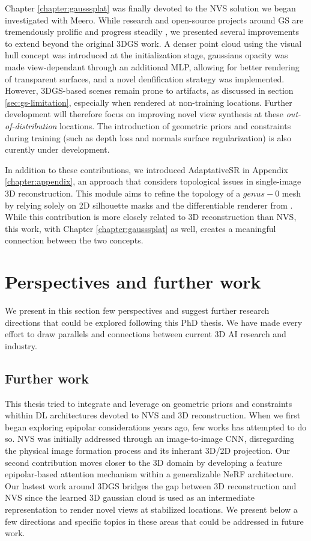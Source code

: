 Chapter \ref{chapter:gausssplat} was finally devoted to the \ac{NVS} solution we began investigated with Meero.  While research and open-source projects around \ac{GS} \citep{kerbl20233d} are tremendously prolific and progress steadily \citep{luiten2023dynamic,yang2024gaussianobject,wewer24latentsplat}, we presented several improvements to extend beyond the original 3D\ac{GS} work. A denser point cloud using the visual hull concept was introduced at the initialization stage, gaussians opacity was made view-dependant through an additional \ac{MLP}, allowing for better rendering of transparent surfaces, and a novel denfification strategy was implemented. However, 3D\ac{GS}-based scenes remain prone to artifacts, as discussed in section \ref{sec:gs-limitation}, especially when rendered at non-training locations. Further development will therefore focus on improving novel view synthesis at these \textit{out-of-distribution} locations. The introduction of geometric priors and constraints during training (such as depth loss and normals surface regularization) is also curently under development. 

In addition to these contributions, we introduced AdaptativeSR in Appendix \ref{chapter:appendix}, an approach that considers topological issues in single-image 3D reconstruction. This module aims to refine the topology of a $genus-0$ mesh by relying solely on 2D silhouette masks and the differentiable renderer from \citep{liu2019soft}. While this contribution is more closely related to 3D reconstruction than \ac{NVS}, this work, with Chapter \ref{chapter:gausssplat} as well, creates a meaningful connection between the two concepts. 

\section{Perspectives and further work}
We present in this section few perspectives and suggest further research directions that could be explored following this PhD thesis. We have made every effort to draw parallels and connections between current 3D \ac{AI} research and industry. 

\subsection{Further work}
This thesis tried to integrate and leverage on geometric priors and constraints whithin \ac{DL} architectures devoted to \ac{NVS} and 3D reconstruction. When we first began exploring epipolar considerations years ago, few works has attempted to do so. \ac{NVS} was initially addressed through an image-to-image \ac{CNN}, disregarding the physical image formation process and its inherant 3D/2D projection. Our second contribution moves closer to the 3D domain by developing a feature epipolar-based attention mechanism within a generalizable \ac{NeRF} architecture. Our lastest work around 3D\ac{GS} bridges the gap between 3D reconstruction and \ac{NVS} since the learned 3D gaussian cloud is used as an intermediate representation to render novel views at stabilized locations. We present below a few directions and specific topics in these areas that could be addressed in future work.

